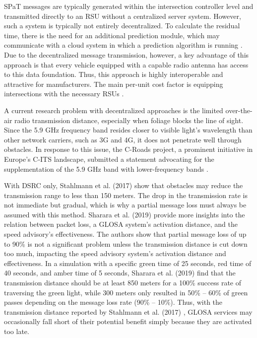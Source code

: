 SPaT messages are typically generated within the intersection controller level \cite{zweck_traffic_2013} and transmitted directly to an RSU without a centralized server system. However, such a system is typically not entirely decentralized. To calculate the residual time, there is the need for an additional prediction module, which may communicate with a cloud system in which a prediction algorithm is running \cite{strobl_c-its_2019, neuner_leitfaden_2020}. Due to the decentralized message transmission, however, a key advantage of this approach is that every vehicle equipped with a capable radio antenna has access to this data foundation. Thus, this approach is highly interoperable and attractive for manufacturers. The main per-unit cost factor is equipping intersections with the necessary RSUs \cite{niebel_cost-benefit-based_2013}.

A current research problem with decentralized approaches is the limited over-the-air radio transmission distance, especially when foliage blocks the line of sight. Since the 5.9 GHz frequency band resides closer to visible light's wavelength than other network carriers, such as 3G and 4G, it does not penetrate well through obstacles. In response to this issue, the C-Roads project, a prominent initiative in Europe's C-ITS landscape, submitted a statement advocating for the supplementation of the 5.9 GHz band with lower-frequency bands \cite{bohm_radio_2017}.

With DSRC only, Stahlmann et al. (2017) \cite{stahlmann_multi-hop_2017} show that obstacles may reduce the transmission range to less than 150 meters. The drop in the transmission rate is not immediate but gradual, which is why a partial message loss must always be assumed with this method. Sharara et al. (2019) \cite{sharara_impact_2019} provide more insights into the relation between packet loss, a GLOSA system's activation distance, and the speed advisory's effectiveness. The authors show that partial message loss of up to 90\% is not a significant problem unless the transmission distance is cut down too much, impacting the speed advisory system's activation distance and effectiveness. In a simulation with a specific green time of 25 seconds, red time of 40 seconds, and amber time of 5 seconds, Sharara et al. (2019) \cite{sharara_impact_2019} find that the transmission distance should be at least 850 meters for a 100\% success rate of traversing the green light, while 300 meters only resulted in 50\% -- 60\% of green passes depending on the message loss rate (90\% -- 10\%). Thus, with the transmission distance reported by Stahlmann et al. (2017) \cite{stahlmann_multi-hop_2017}, GLOSA services may occasionally fall short of their potential benefit simply because they are activated too late.

